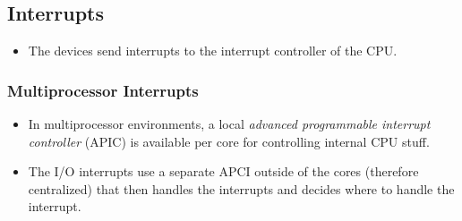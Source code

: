         \subsection{Interrupts}
            \begin{itemize}
            	\item The devices send interrupts to the interrupt controller of the CPU.
            \end{itemize}
        
            \subsubsection{Multiprocessor Interrupts}
	            \begin{itemize}
	            	\item In multiprocessor environments, a local \textit{advanced programmable interrupt controller} (APIC) is available per core for controlling internal CPU stuff.
	            	\item The I/O interrupts use a separate APCI outside of the cores (therefore centralized) that then handles the interrupts and decides where to handle the interrupt.
	            \end{itemize}

